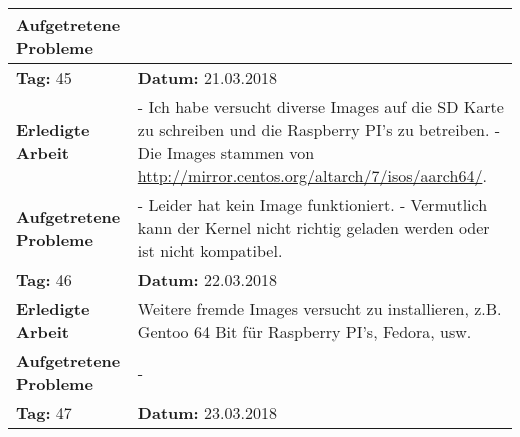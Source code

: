 \begin{longtable}{|p{5cm}|p{5cm}p{6cm}|}
\textbf{Aufgetretene Probleme} & \multicolumn{2}{p{11cm}|}{} \\ \hline
\rowcolor{heading}\textbf{Tag:} 45 & \textbf{Datum:} 21.03.2018 & \\ \hline
\textbf{Erledigte Arbeit} & \multicolumn{2}{p{11cm}|}{- Ich habe versucht diverse Images auf die SD Karte zu schreiben und die Raspberry PI's zu betreiben. \newline
- Die Images stammen von \url{http://mirror.centos.org/altarch/7/isos/aarch64/}.} \\ \hline
\textbf{Aufgetretene Probleme} & \multicolumn{2}{p{11cm}|}{- Leider hat kein Image funktioniert. \newline
- Vermutlich kann der Kernel nicht richtig geladen werden oder ist nicht kompatibel.} \\ \hline
\rowcolor{heading}\textbf{Tag:} 46 & \textbf{Datum:} 22.03.2018 & \\ \hline
\textbf{Erledigte Arbeit} & \multicolumn{2}{p{11cm}|}{Weitere fremde Images versucht zu installieren, z.B. Gentoo 64 Bit für Raspberry PI's, Fedora, usw.} \\ \hline
\textbf{Aufgetretene Probleme \newline \newline \newline \newline \newline \newline \newline \newline \newline \newline \newline \newline \newline \newline \newline \newline \newline \newline } & \multicolumn{2}{p{11cm}|}{-} \\ \hline
\rowcolor{heading}\textbf{Tag:} 47 & \textbf{Datum:} 23.03.2018 & \\ \hline

\end{longtable}
